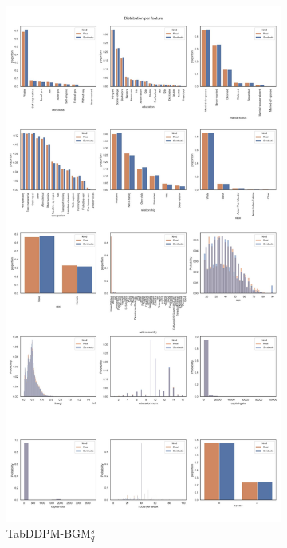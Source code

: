 \begin{landscape}
\begin{figure}[h]
		\hfill
		\begin{subfigure}{0.3\linewidth}
			\includegraphics[height=\textheight,width=\linewidth,keepaspectratio]{images/distributions_full/tab-ddpm-bgm-simTune.jpg}
			\caption{TabDDPM-BGM$^{s}_q$}
		\end{subfigure}
		\hfill
		\begin{subfigure}{0.3\linewidth}

\end{subfigure}
\end{figure}
\end{landscape}
